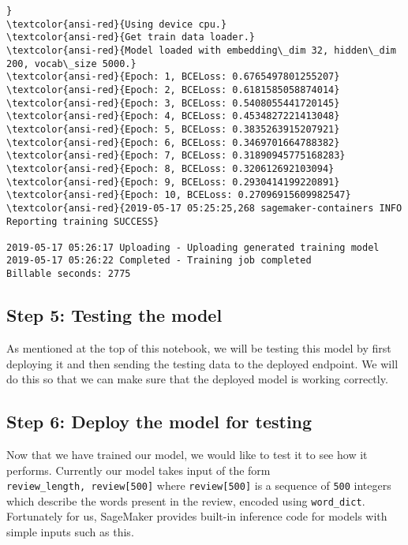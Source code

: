 \documentclass[11pt]{article}
\begin{document}
\begin{Verbatim}[commandchars=\\\{\}]
}
\textcolor{ansi-red}{Using device cpu.}
\textcolor{ansi-red}{Get train data loader.}
\textcolor{ansi-red}{Model loaded with embedding\_dim 32, hidden\_dim 200, vocab\_size 5000.}
\textcolor{ansi-red}{Epoch: 1, BCELoss: 0.6765497801255207}
\textcolor{ansi-red}{Epoch: 2, BCELoss: 0.6181585058874014}
\textcolor{ansi-red}{Epoch: 3, BCELoss: 0.5408055441720145}
\textcolor{ansi-red}{Epoch: 4, BCELoss: 0.4534827221413048}
\textcolor{ansi-red}{Epoch: 5, BCELoss: 0.3835263915207921}
\textcolor{ansi-red}{Epoch: 6, BCELoss: 0.3469701664788382}
\textcolor{ansi-red}{Epoch: 7, BCELoss: 0.31890945775168283}
\textcolor{ansi-red}{Epoch: 8, BCELoss: 0.320612692103094}
\textcolor{ansi-red}{Epoch: 9, BCELoss: 0.2930414199220891}
\textcolor{ansi-red}{Epoch: 10, BCELoss: 0.27096915609982547}
\textcolor{ansi-red}{2019-05-17 05:25:25,268 sagemaker-containers INFO     Reporting training SUCCESS}

2019-05-17 05:26:17 Uploading - Uploading generated training model
2019-05-17 05:26:22 Completed - Training job completed
Billable seconds: 2775

    \end{Verbatim}

    \hypertarget{step-5-testing-the-model}{%
\subsection{Step 5: Testing the model}\label{step-5-testing-the-model}}

As mentioned at the top of this notebook, we will be testing this model
by first deploying it and then sending the testing data to the deployed
endpoint. We will do this so that we can make sure that the deployed
model is working correctly.

\hypertarget{step-6-deploy-the-model-for-testing}{%
\subsection{Step 6: Deploy the model for
testing}\label{step-6-deploy-the-model-for-testing}}

Now that we have trained our model, we would like to test it to see how
it performs. Currently our model takes input of the form
\texttt{review\_length,\ review{[}500{]}} where \texttt{review{[}500{]}}
is a sequence of \texttt{500} integers which describe the words present
in the review, encoded using \texttt{word\_dict}. Fortunately for us,
SageMaker provides built-in inference code for models with simple inputs
such as this.
\end{document}

